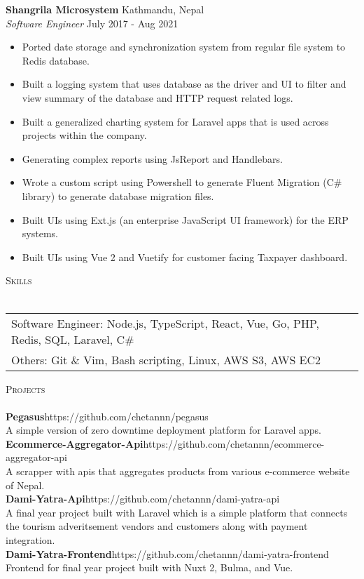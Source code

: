 \documentclass[a4paper]{article}
\newcommand{\lineunder} {
    \vspace*{-8pt} \\
    \hspace*{-18pt} \hrulefill \\
}
\newcommand{\header} [1] {
    {\hspace*{-18pt}\vspace*{6pt} \textsc{#1}}
    \vspace*{-6pt} \lineunder
}
\begin{document}
\textbf{Shangrila Microsystem} \hfill Kathmandu, Nepal\\
\textit{Software Engineer} \hfill July 2017 - Aug 2021\\
\vspace{-1mm}
\begin{itemize} \itemsep 1pt
	\item Ported date storage and synchronization system from regular file system to Redis database.
	\item Built a logging system that uses database as the driver and UI to filter and view summary of the database and HTTP request related logs.
	\item Built a generalized charting system for Laravel apps that is used across projects within the company.
	\item Generating complex reports using JsReport and Handlebars.
	\item Wrote a custom script using Powershell to generate Fluent Migration (C\# library) to generate database migration files.
	\item Built UIs using Ext.js (an enterprise JavaScript UI framework) for the ERP systems.
	\item Built UIs using Vue 2 and Vuetify for customer facing Taxpayer dashboard.
\end{itemize}


\header{Skills}
\begin{tabularx}{\textwidth}{ l X } 
	Software Engineer:  Node.js, TypeScript, React, Vue, Go, PHP, Redis, SQL, Laravel, C\#      \\
	Others:       Git \& Vim, Bash scripting, Linux, AWS S3, AWS EC2  \\
\end{tabularx}
\vspace{2mm}

\header{Projects}
{\textbf{Pegasus}}\hfill https://github.com/chetannn/pegasus\\
A simple version of zero downtime deployment platform for Laravel apps.\\
\vspace*{2mm}
{\textbf{Ecommerce-Aggregator-Api}}\hfill https://github.com/chetannn/ecommerce-aggregator-api\\
A scrapper with apis that aggregates products from various e-commerce website of Nepal.\\
\vspace*{2mm}
{\textbf{Dami-Yatra-Api}}\hfill https://github.com/chetannn/dami-yatra-api\\
A final year project built with Laravel which is a simple platform that connects the tourism adveritsement vendors and customers along with payment integration.\\
\vspace*{2mm}
{\textbf{Dami-Yatra-Frontend}}\hfill https://github.com/chetannn/dami-yatra-frontend\\
Frontend for final year project built with Nuxt 2, Bulma, and Vue.\\
\vspace*{2mm}
\
\end{document}
